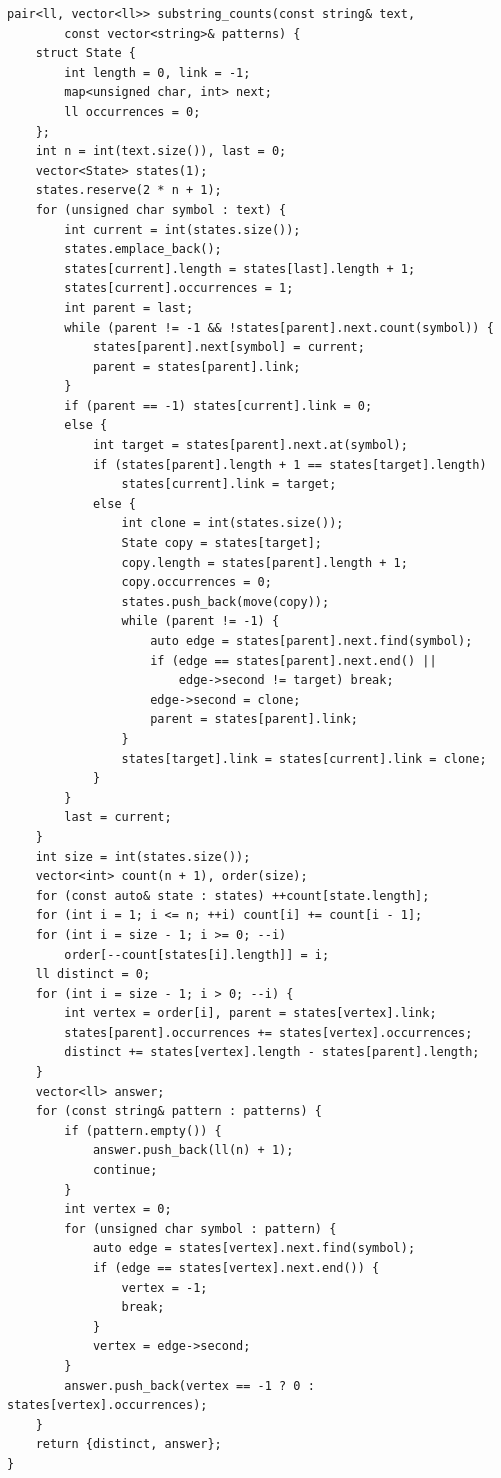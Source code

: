 \begin{lstlisting}[name=extra_string_suffix_automaton]
pair<ll, vector<ll>> substring_counts(const string& text,
        const vector<string>& patterns) {
    struct State {
        int length = 0, link = -1;
        map<unsigned char, int> next;
        ll occurrences = 0;
    };
    int n = int(text.size()), last = 0;
    vector<State> states(1);
    states.reserve(2 * n + 1);
    for (unsigned char symbol : text) {
        int current = int(states.size());
        states.emplace_back();
        states[current].length = states[last].length + 1;
        states[current].occurrences = 1;
        int parent = last;
        while (parent != -1 && !states[parent].next.count(symbol)) {
            states[parent].next[symbol] = current;
            parent = states[parent].link;
        }
        if (parent == -1) states[current].link = 0;
        else {
            int target = states[parent].next.at(symbol);
            if (states[parent].length + 1 == states[target].length)
                states[current].link = target;
            else {
                int clone = int(states.size());
                State copy = states[target];
                copy.length = states[parent].length + 1;
                copy.occurrences = 0;
                states.push_back(move(copy));
                while (parent != -1) {
                    auto edge = states[parent].next.find(symbol);
                    if (edge == states[parent].next.end() ||
                        edge->second != target) break;
                    edge->second = clone;
                    parent = states[parent].link;
                }
                states[target].link = states[current].link = clone;
            }
        }
        last = current;
    }
    int size = int(states.size());
    vector<int> count(n + 1), order(size);
    for (const auto& state : states) ++count[state.length];
    for (int i = 1; i <= n; ++i) count[i] += count[i - 1];
    for (int i = size - 1; i >= 0; --i)
        order[--count[states[i].length]] = i;
    ll distinct = 0;
    for (int i = size - 1; i > 0; --i) {
        int vertex = order[i], parent = states[vertex].link;
        states[parent].occurrences += states[vertex].occurrences;
        distinct += states[vertex].length - states[parent].length;
    }
    vector<ll> answer;
    for (const string& pattern : patterns) {
        if (pattern.empty()) {
            answer.push_back(ll(n) + 1);
            continue;
        }
        int vertex = 0;
        for (unsigned char symbol : pattern) {
            auto edge = states[vertex].next.find(symbol);
            if (edge == states[vertex].next.end()) {
                vertex = -1;
                break;
            }
            vertex = edge->second;
        }
        answer.push_back(vertex == -1 ? 0 : states[vertex].occurrences);
    }
    return {distinct, answer};
}
\end{lstlisting}
